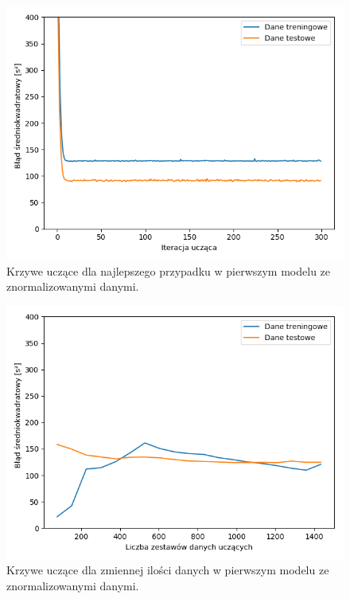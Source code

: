 \documentclass[12pt]{aghdpl}
\newenvironment{tightcenter}{
  \setlength\topsep{0pt}
  \setlength\parskip{0pt}
  \begin{center}
}{
  \end{center}
}
\begin{document}
		\begin{figure}[h]
			\begin{tightcenter}
	 			\includegraphics[width = \linewidth]{wykresy/2_normalizacja_danych/wykres_uczenia.png}
	 		\end{tightcenter}
	 		
 			\caption{Krzywe uczące dla najlepszego przypadku w pierwszym modelu ze znormalizowanymi danymi.}
			\label{fig: pierwszy_model_wykres_uczenia_z_normalizacja}
		\end{figure}
		
		\begin{figure}[h]
			\begin{tightcenter}
	 			\includegraphics[width = \linewidth]{wykresy/2_normalizacja_danych/learning_curves.png}
	 		\end{tightcenter}
	 		
 			\caption{Krzywe uczące dla zmiennej ilości danych w pierwszym modelu ze znormalizowanymi danymi.}
			\label{fig: pierwszy_model_learning_curves_z_normalizacja}
		\end{figure}
		
\end{document}
